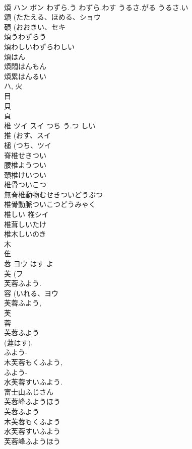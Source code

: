 \documentclass[8pt]{extreport}
\begin{document}
\begin{CJK}{UTF8}{min}
\\	煩	ハン ボン	わずら.う わずら.わす うるさ.がる うるさ.い	
\\	頌 (たたえる、ほめる、ショウ 
\\	碩 (おおきい、セキ 
\\	煩うわずらう 
\\	煩わしいわずらわしい 
\\	煩はん 
\\	煩悶はんもん 
\\	煩累はんるい 
\\	ハ, 火 
\\	目 
\\	貝 
\\	頁 
\\	椎	ツイ スイ	つち う.つ しい	
\\	推 (おす、スイ 
\\	槌 (つち、ツイ 
\\	脊椎せきつい 
\\	腰椎ようつい 
\\	頚椎けいつい 
\\	椎骨ついこつ 
\\	無脊椎動物むせきついどうぶつ 
\\	椎骨動脈ついこつどうみゃく 
\\	椎しい 椎シイ 
\\	椎茸しいたけ 
\\	椎木しいのき 
\\	木 
\\	隹 
\\	蓉	ヨウ	はす よ	
\\	芙 (フ 
\\	芙蓉ふよう. 
\\	容 (いれる、ヨウ 
\\	芙蓉ふよう, 
\\	芙 
\\	蓉 
\\	芙蓉ふよう 
\\	(蓮はす). 
\\	ふよう-
\\	木芙蓉もくふよう, 
\\	ふよう-
\\	水芙蓉すいふよう. 
\\	富士山ふじさん 
\\	芙蓉峰ふようほう 
\\	芙蓉ふよう
\\	木芙蓉もくふよう
\\	水芙蓉すいふよう
\\	芙蓉峰ふようほう

\end{CJK}
\end{document}
